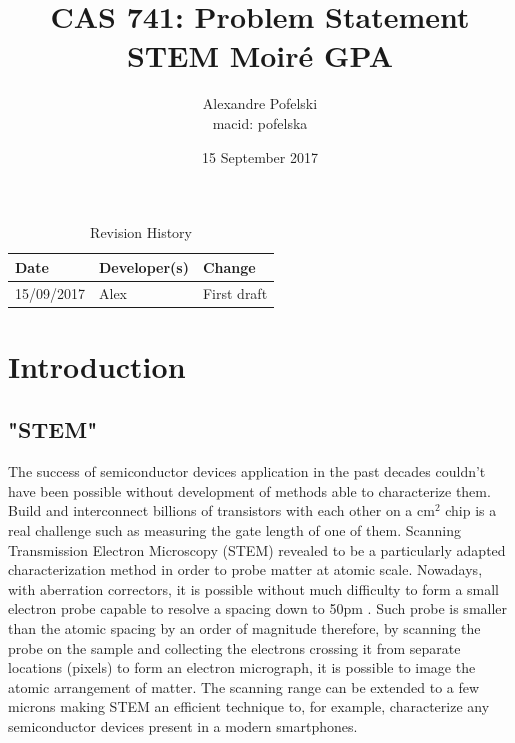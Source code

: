 \documentclass{article}
\title{CAS 741: Problem Statement\\STEM Moir{\'e} GPA}
\author{Alexandre Pofelski \\
macid: pofelska}
\date{15 September 2017}
\begin{document}
\maketitle
\clearpage

\begin{table}[hp]
\caption{Revision History} \label{TblRevisionHistory}
\begin{tabularx}{\textwidth}{llX}
\toprule
\textbf{Date} & \textbf{Developer(s)} & \textbf{Change}\\
\midrule
15/09/2017 & Alex & First draft\\
\bottomrule
\end{tabularx}
\end{table}

\clearpage
\tableofcontents
\clearpage

\section{Introduction}
\subsection{"STEM"}
The success of semiconductor devices application in the past decades couldn't have been possible without development of methods able to characterize them. Build and interconnect billions of transistors with each other on a cm$^{2}$ chip is a real challenge such as measuring the gate length of one of them. Scanning Transmission Electron Microscopy (STEM) revealed to be a particularly adapted characterization method in order to probe matter at atomic scale. Nowadays, with aberration correctors, it is possible without much difficulty to form a small electron probe capable to resolve a spacing down to 50pm \cite{Erni2009}. Such probe is smaller than the atomic spacing by an order of magnitude therefore, by scanning the probe on the sample and collecting the electrons crossing it from separate locations (pixels) to form an electron micrograph, it is possible to image the atomic arrangement of matter. The scanning range can be extended to a few microns making STEM an efficient technique to, for example, characterize any semiconductor devices present in a modern smartphones.
\end{document}
